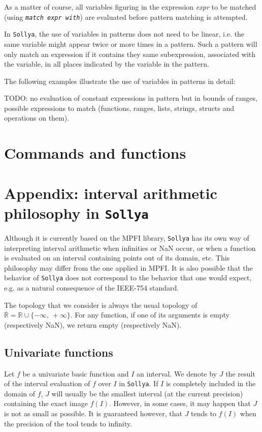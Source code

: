 \documentclass[a4paper]{article}
\newcommand{\key}[1]{\texttt{#1}}
\newcommand{\sollya}{\texttt{Sollya}\xspace}
\begin{document}
As a matter of course, all variables figuring in the expression {\it
  expr} to be matched (using {\it \key{match expr with}}) are
evaluated before pattern matching is attempted.

In \sollya, the use of variables in patterns does not need to be
linear, i.e.  the same variable might appear twice or more times in a
pattern. Such a pattern will only match an expression if it contains
they same subexpression, associated with the variable, in all places 
indicated by the variable in the pattern.

The following examples illustrate the use of variables in patterns in
detail:






TODO: no evaluation of constant expressions in pattern but in
bounds of ranges, possible expressions to match (functions, ranges,
lists, strings, structs and operations on them).



\section{Commands and functions}



\newpage
\section{Appendix: interval arithmetic philosophy in \sollya}
\label{IntervalArithmeticPhilopshy}

Although it is currently based on the MPFI library, \sollya has its own way of interpreting interval arithmetic when infinities or NaN occur, or when a function is evaluated on an interval containing points out of its domain, etc. This philosophy may differ from the one applied in MPFI. It is also possible that the behavior of \sollya does not correspond to the behavior that one would expect, e.g. as a natural consequence of the IEEE-754 standard.

The topology that we consider is always the usual topology of $\overline{\mathbb{R}} = \mathbb{R} \cup \{-\infty,\,+\infty\}$. For any function, if one of its arguments is empty (respectively NaN), we return empty (respectively NaN).

\subsection{Univariate functions}
Let $f$ be a univariate basic function and $I$ an interval. We denote by $J$ the result of the interval evaluation of $f$ over $I$ in \sollya. If $I$ is completely included in the domain of $f$, $J$ will usually be the smallest interval (at the current precision) containing the exact image $f(I)$. However, in some cases, it may happen that $J$ is not as small as possible. It is guaranteed however, that $J$ tends to $f(I)$ when the precision of the tool tends to infinity.
\end{document}
